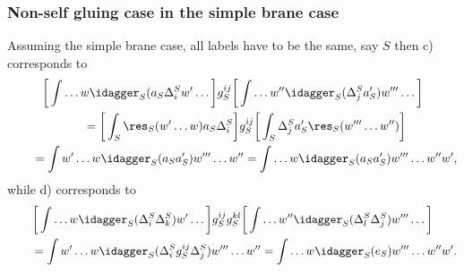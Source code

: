 \subsubsection{Non-self gluing case in the simple brane case}

Assuming the simple brane case, all labels have to be the same, say
$S$ then c) corresponds to
\begin{gather*}
\bigg[\int \dots w  \idagger_{S}(a_S \Delta^{S}_i  w'\dots\bigg]  g^{ij}_{S}
\bigg[\int  \dots w'' \idagger_S (\Delta_j^{S}a'_S) w''' \dots\bigg]  \\
\qquad{} = \bigg[\int_S \res _S (w' \dots w) a_S \Delta^{S}_i \bigg] g^{ij}_{S}
\bigg[\int_S  \Delta_j^{S}a'_S \res_S( w''' \dots w'')\bigg]\\
\qquad{} = \int w' \dots w \idagger_S (a_S a'_S)  w''' \dots w''
 =  \int \dots w \idagger_S(a_S a'_S)  w'''  \dots w'' w',
\end{gather*}
while d) corresponds to
\begin{gather*}
\bigg[\int \dots w  \idagger_{S}(\Delta^{S}_i  \Delta^{S}_{k}) w'\dots \bigg] g^{ij}_{S}g^{kl}_{S}
 \bigg[\int  \dots w'' \idagger_{S}( \Delta_l^{S} \Delta_j^{S}) w''' \dots \bigg]  \\
\qquad{} = \int w' \dots w \idagger_S (\Delta_i^S g_S^{ij}\Delta_j^S)  w''' \dots w''
 = \int \dots w \idagger_S(e_S)  w'''  \dots w'' w'.
\end{gather*}

